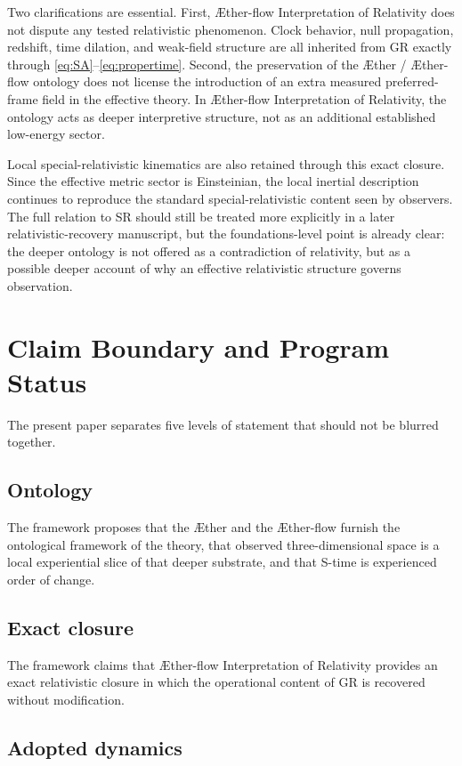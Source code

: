 \documentclass[11pt]{article}
\newcommand{\Aether}{\AE{}ther}
\newcommand{\Aflow}{\AE{}ther-flow}
\newcommand{\TheoryName}{\Aflow{} Interpretation of Relativity}
\begin{document}
Two clarifications are essential. First, \TheoryName{} does not dispute any tested relativistic phenomenon. Clock behavior, null propagation, redshift, time dilation, and weak-field structure are all inherited from GR exactly through \eqref{eq:SA}--\eqref{eq:propertime}. Second, the preservation of the \Aether{} / \Aflow{} ontology does not license the introduction of an extra measured preferred-frame field in the effective theory. In \TheoryName{}, the ontology acts as deeper interpretive structure, not as an additional established low-energy sector.

Local special-relativistic kinematics are also retained through this exact closure. Since the effective metric sector is Einsteinian, the local inertial description continues to reproduce the standard special-relativistic content seen by observers. The full relation to SR should still be treated more explicitly in a later relativistic-recovery manuscript, but the foundations-level point is already clear: the deeper ontology is not offered as a contradiction of relativity, but as a possible deeper account of why an effective relativistic structure governs observation.

\section{Claim Boundary and Program Status}

The present paper separates five levels of statement that should not be blurred together.

\subsection{Ontology}

The framework proposes that the \Aether{} and the \Aflow{} furnish the ontological framework of the theory, that observed three-dimensional space is a local experiential slice of that deeper substrate, and that S-time is experienced order of change.

\subsection{Exact closure}

The framework claims that \TheoryName{} provides an exact relativistic closure in which the operational content of GR is recovered without modification.

\subsection{Adopted dynamics}
\end{document}
